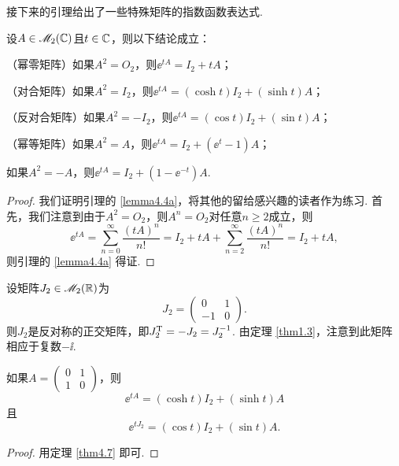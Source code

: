 接下来的引理给出了一些特殊矩阵的指数函数表达式.
\begin{lemma}
  设$A\in\mathscr M_2(\mathbb C)$且$t\in\mathbb C$，则以下结论成立：
  \begin{enum}
    \item\label{lemma4.4a} （幂零矩阵）如果$A^2=O_2$，则$\ee^{tA}=I_2+tA$；
    \item （对合矩阵）如果$A^2=I_2$，则$\ee^{tA}=(\cosh t)I_2+(\sinh t)A$；
    \item （反对合矩阵）如果$A^2=-I_2$，则$\ee^{tA}=(\cos t)I_2+(\sin t)A$；
    \item （幂等矩阵）如果$A^2=A$，则$\ee^{tA}=I_2+(\ee^t-1)A$；
    \item 如果$A^2=-A$，则$\ee^{tA}=I_2+(1-\ee^{-t})A$.
  \end{enum}
\end{lemma}

\begin{proof}
  我们证明引理的 \ref{lemma4.4a}，将其他的留给感兴趣的读者作为练习. 首先，我们注意到由于$A^2=O_2$，则$A^n=O_2$对任意$n\ge2$成立，则
  \[
    \ee^{tA} = \sum_{n=0}^\infty \frac{(tA)^n}{n!} = I_2 + tA + \sum_{n=2}^\infty \frac{(tA)^n}{n!} = I_2 + tA,
  \]
  则引理的 \ref{lemma4.4a} 得证.
\end{proof}

设矩阵$J_2\in\mathscr M_2(\mathbb R)$为
\[
  J_2 = \begin{pmatrix}
    0 & 1 \\
    -1 & 0
  \end{pmatrix}.
\]
则$J_2$是反对称的正交矩阵，即$J_2^{\mathrm T}=-J_2=J_2^{-1}$. 由定理 \ref{thm1.3}，注意到此矩阵相应于复数$-\ii$.

\begin{lemma}
  如果$A=\begin{pmatrix}
    0 & 1 \\
    1 & 0
  \end{pmatrix}$，则
  \[
    \ee^{tA} = (\cosh t)I_2 + (\sinh t)A
  \]
  且
  \[
    \ee^{tJ_2} = (\cos t)I_2 + (\sin t)A.
  \]
\end{lemma}
\begin{proof}
  用定理 \ref{thm4.7} 即可.
\end{proof}

